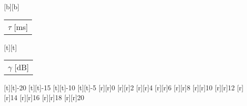 %    
%
%
%
[b][b]{\fontsize{8.5}{12.75}\selectfont \color[rgb]{0,0,0}\setlength{\tabcolsep}{0pt}\begin{tabular}{c}$\tau$ [ms]\end{tabular}}%
[t][t]{\fontsize{8.5}{12.75}\selectfont \color[rgb]{0,0,0}\setlength{\tabcolsep}{0pt}\begin{tabular}{c}$\gamma$ [dB]\end{tabular}}%
%
\fontsize{8.5}{12.75}%
\selectfont%
%
[t][t]{-20}%
[t][t]{-15}%
[t][t]{-10}%
[t][t]{-5}%
%
[r][r]{0}%
[r][r]{2}%
[r][r]{4}%
[r][r]{6}%
[r][r]{8}%
[r][r]{10}%
[r][r]{12}%
[r][r]{14}%
[r][r]{16}%
[r][r]{18}%
[r][r]{20}%
%
%
